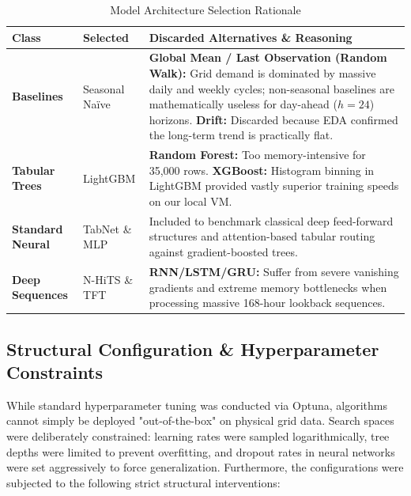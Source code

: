 \documentclass{article}
\begin{document}
\begin{table}[ht]
\centering
\caption{Model Architecture Selection Rationale}
\label{tab:model_selection}
\vspace{0.2cm}
\begin{tabular}{p{3.2cm} p{2.5cm} p{7.8cm}}
\toprule
\textbf{Class} & \textbf{Selected} & \textbf{Discarded Alternatives \& Reasoning} \\
\midrule
\textbf{Baselines} & Seasonal Naïve & \textbf{Global Mean / Last Observation (Random Walk):} Grid demand is dominated by massive daily and weekly cycles; non-seasonal baselines are mathematically useless for day-ahead ($h=24$) horizons. \textbf{Drift:} Discarded because EDA confirmed the long-term trend is practically flat. \\
\midrule
\textbf{Tabular Trees} & LightGBM & \textbf{Random Forest:} Too memory-intensive for 35,000 rows. \textbf{XGBoost:} Histogram binning in LightGBM provided vastly superior training speeds on our local VM. \\
\midrule
\textbf{Standard Neural} & TabNet \& MLP & Included to benchmark classical deep feed-forward structures and attention-based tabular routing against gradient-boosted trees. \\
\midrule
\textbf{Deep Sequences} & N-HiTS \& TFT & \textbf{RNN/LSTM/GRU:} Suffer from severe vanishing gradients and extreme memory bottlenecks when processing massive 168-hour lookback sequences. \\
\bottomrule
\end{tabular}
\end{table}

\subsection*{Structural Configuration \& Hyperparameter Constraints}

While standard hyperparameter tuning was conducted via Optuna, algorithms cannot simply be deployed "out-of-the-box" on physical grid data. Search spaces were deliberately constrained: learning rates were sampled logarithmically, tree depths were limited to prevent overfitting, and dropout rates in neural networks were set aggressively to force generalization. Furthermore, the configurations were subjected to the following strict structural interventions:
\end{document}
